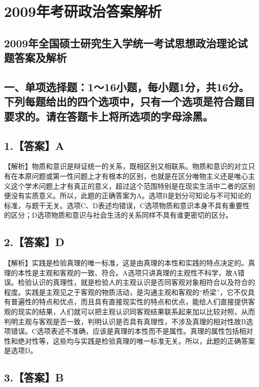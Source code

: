 \documentclass[UTF8,11pt]{ctexart}
\begin{document}
\section*{2009年考研政治答案解析}
\subsection*{2009年全国硕士研究生入学统一考试思想政治理论试题答案及解析}

\subsection*{一、单项选择题：1～16小题，每小题1分，共16分。下列每题给出的四个选项中，只有一个选项是符合题目要求的。请在答题卡上将所选项的字母涂黑。}

\subsection*{1.【答案】A}

【解析】物质和意识是辩证统一的关系，既相区别又相联系。物质和意识的对立只有在本原问题或第一性问题上才有根本的区别，也就是在区分唯物主义还是唯心主义这个学术问题上才有真正的意义，超过这个范围特别是在现实生活中二者的区别便没有实质意义。所以，此题的正确答案为A。选项B是划分可知论与不可知论的标准，与题干无关。选项C、D表述均错误，C选项物质和意识本身不具有重要性的区分；D选项物质和意识与社会生活的关系同样不具有谁更密切的区分。


\subsection*{2.【答案】D}

【解析】实践是检验真理的唯一标准，这是由真理的本性和实践的特点决定的。真理的本性是主观和客观的一致、符合。A选项只讲真理的主观性不科学，故A错误。检验认识的真理性，就是检验人的主观认识是否同客观对象相符合以及符合的程度。实践是主观见之于客观的物质活动，是沟通主观和客观的“桥梁”，它不仅具有普遍性的特点和优点，而且具有直接现实性的特点和优点，能给人们直接提供客观的现实的结果，人们就可以把主观认识同客观结果联系起来加以比较对照，从而判明主观与客观是否一致，判明认识是否具有真理性，不涉及真理的相对性故B选项错误。C选项表述不准确，应该是真理的本性而不是属性。真理的属性包括相对性和绝对性等，这些均与实践是检验真理的唯一标准无关。所以，此题的正确答案是选项D。


\subsection*{3.【答案】B}
\end{document}
